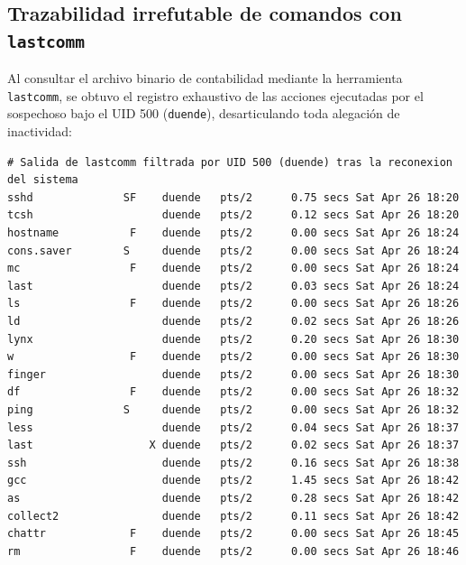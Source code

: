 \subsection{Trazabilidad irrefutable de comandos con \texttt{lastcomm}}

Al consultar el archivo binario de contabilidad mediante la herramienta \texttt{lastcomm}, se obtuvo el registro exhaustivo de las acciones ejecutadas por el sospechoso bajo el UID 500 (\texttt{duende}), desarticulando toda alegación de inactividad:

\begin{lstlisting}[style=terminal]
# Salida de lastcomm filtrada por UID 500 (duende) tras la reconexion del sistema
sshd              SF    duende   pts/2      0.75 secs Sat Apr 26 18:20
tcsh                    duende   pts/2      0.12 secs Sat Apr 26 18:20
hostname           F    duende   pts/2      0.00 secs Sat Apr 26 18:24
cons.saver        S     duende   pts/2      0.00 secs Sat Apr 26 18:24
mc                 F    duende   pts/2      0.00 secs Sat Apr 26 18:24
last                    duende   pts/2      0.03 secs Sat Apr 26 18:24
ls                 F    duende   pts/2      0.00 secs Sat Apr 26 18:26
ld                      duende   pts/2      0.02 secs Sat Apr 26 18:26
lynx                    duende   pts/2      0.20 secs Sat Apr 26 18:30
w                  F    duende   pts/2      0.00 secs Sat Apr 26 18:30
finger                  duende   pts/2      0.00 secs Sat Apr 26 18:30
df                 F    duende   pts/2      0.00 secs Sat Apr 26 18:32
ping              S     duende   pts/2      0.00 secs Sat Apr 26 18:32
less                    duende   pts/2      0.04 secs Sat Apr 26 18:37
last                  X duende   pts/2      0.02 secs Sat Apr 26 18:37
ssh                     duende   pts/2      0.16 secs Sat Apr 26 18:38
gcc                     duende   pts/2      1.45 secs Sat Apr 26 18:42
as                      duende   pts/2      0.28 secs Sat Apr 26 18:42
collect2                duende   pts/2      0.11 secs Sat Apr 26 18:42
chattr             F    duende   pts/2      0.00 secs Sat Apr 26 18:45
rm                 F    duende   pts/2      0.00 secs Sat Apr 26 18:46
\end{lstlisting}

